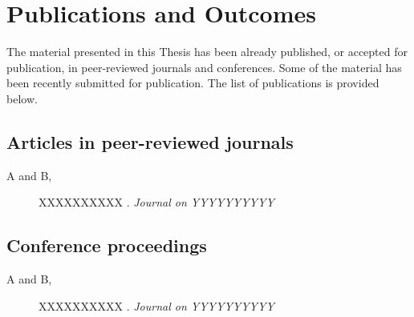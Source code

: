 \chapter{Publications and Outcomes}
The material  presented in this Thesis has been already published, or
accepted for publication, in peer-reviewed journals and conferences. Some of the
material has been recently submitted for publication. The list of publications is provided below.



\section*{Articles in peer-reviewed journals }

	\begin{description}
	\item[ A and B,]
	XXXXXXXXXX
     .  \emph{Journal on YYYYYYYYYY}


	\end{description}







\section*{Conference proceedings}

	\begin{description}
	\item[ A and B,]
	XXXXXXXXXX
     .  \emph{Journal on YYYYYYYYYY}


	\end{description}





